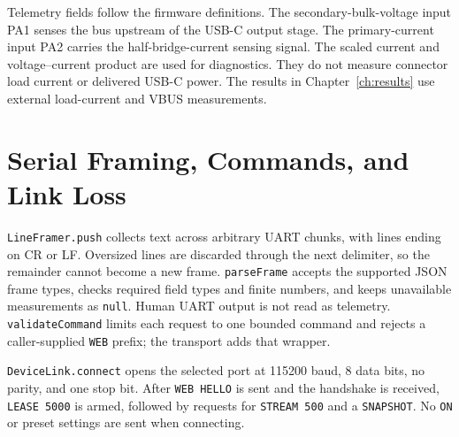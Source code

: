 Telemetry fields follow the firmware definitions. The secondary-bulk-voltage
input PA1 senses the bus upstream of the USB-C output stage. The
primary-current input PA2 carries the half-bridge-current sensing signal. The scaled current and voltage--current
product are used for diagnostics. They do not measure connector load current
or delivered USB-C power. The results in Chapter~\ref{ch:results} use external
load-current and VBUS measurements.

\section{Serial Framing, Commands, and Link Loss}
\label{sec:app-browser-transport}

\texttt{LineFramer.push} collects text across arbitrary UART chunks,
with lines ending on CR or LF. Oversized lines are discarded through
the next delimiter, so the remainder cannot become a new frame.
\texttt{parseFrame} accepts the supported JSON frame types, checks required
field types and finite numbers, and keeps unavailable measurements as
\texttt{null}. Human UART output is not read as telemetry.
\texttt{validateCommand} limits each request to one bounded command and rejects
a caller-supplied \texttt{WEB} prefix; the transport adds that wrapper.

\texttt{DeviceLink.connect} opens the selected port at 115200 baud,
8 data bits, no parity, and one stop bit. After \texttt{WEB HELLO}
is sent and the handshake is received, \texttt{LEASE 5000} is armed,
followed by requests for \texttt{STREAM 500} and a \texttt{SNAPSHOT}.
No \texttt{ON} or preset settings are sent when connecting.

